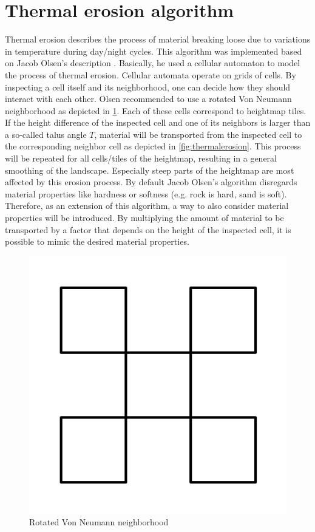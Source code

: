 \documentclass[11pt,a4paper,twoside,openright]{report}
\begin{document}
\section{Thermal erosion algorithm}
\label{sec:thermalerosion}
Thermal erosion describes the process of material breaking loose due to variations in temperature during day/night cycles. This algorithm was implemented based on Jacob Olsen's description \cite{Olsen:2004}. Basically, he used a cellular automaton to model the process of thermal erosion. Cellular automata operate on grids of cells. By inspecting a cell itself and its neighborhood, one can decide how they should interact with each other. Olsen recommended to use a rotated Von Neumann neighborhood as depicted in \cref{fig:rotvonneumann}. Each of these cells correspond to heightmap tiles. If the height difference of the inspected cell and one of its neighbors is larger than a so-called talus angle $T$, material will be transported from the inspected cell to the corresponding neighbor cell as depicted in \cref{fig:thermalerosion}. This process will be repeated for all cells/tiles of the heightmap, resulting in a general smoothing of the landscape. Especially steep parts of the heightmap are most affected by this erosion process. By default Jacob Olsen's algorithm disregards material properties like hardness or softness (e.g. rock is hard, sand is soft). Therefore, as an extension of this algorithm, a way to also consider material properties will be introduced. By multiplying the amount of material to be transported by a factor that depends on the height of the inspected cell, it is possible to mimic the desired material properties.
\begin{figure}[h]
\centering
\includegraphics[width=0.25\linewidth]{rotvonneumann.png}
\caption{Rotated Von Neumann neighborhood}\label{fig:rotvonneumann}
\end{figure}
\end{document}
